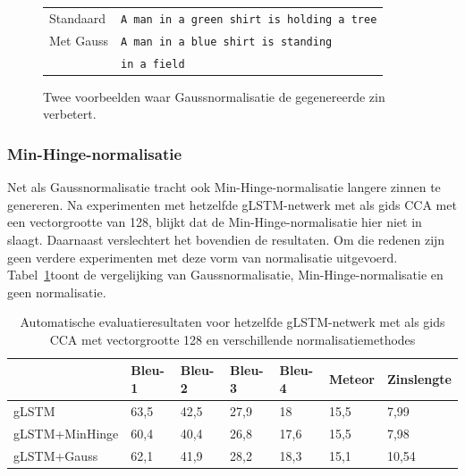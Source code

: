 \begin{figure}
\begin{minipage}[t]{.3\textwidth}
		\end{minipage}\hfill
		\begin{minipage}[t]{.7\textwidth}
			\vspace{0pt}
			\begin{tabular}{ll}
				Standaard & \texttt{A man in a green shirt is holding a tree} \\
				Met Gauss & \texttt{A man in a blue shirt is standing }\\
				~ & \texttt{in a field} \\
			\end{tabular}
		\end{minipage}
\caption{Twee voorbeelden waar Gaussnormalisatie de gegenereerde zin verbetert.}
\label{fig:gauss_improve}
\end{figure}
\subsubsection{Min-Hinge-normalisatie}
Net als Gaussnormalisatie tracht ook Min-Hinge-normalisatie langere zinnen te genereren.
Na experimenten met hetzelfde gLSTM-netwerk met als gids CCA met een vectorgrootte van 128, blijkt dat de Min-Hinge-normalisatie hier niet in slaagt. Daarnaast verslechtert het bovendien de resultaten. Om die redenen zijn geen verdere experimenten met deze vorm van normalisatie uitgevoerd. Tabel~\ref{table:minhinge}toont de vergelijking van Gaussnormalisatie, Min-Hinge-normalisatie en geen normalisatie.

\begin{table}
	\centering
	\begin{tabular}{lllllll}
		~                  & Bleu-1 & Bleu-2 & Bleu-3 & Bleu-4 & Meteor&Zinslengte \\ \hline
		gLSTM        & 63,5   & 42,5 			& 27,9   & 18   & 15,5&7,99  \\
		gLSTM+MinHinge & 60,4   &40,4    &26,8   & 17,6   & 15,5& 7,98 \\
		gLSTM+Gauss   & 62,1   & 41,9   & 28,2   & 18,3 & 15,1& 10,54 \\ \hline
		
	\end{tabular}
	
	\caption{Automatische evaluatieresultaten voor hetzelfde gLSTM-netwerk met als gids CCA met vectorgrootte 128 en verschillende normalisatiemethodes}
	\label{table:minhinge}
\end{table}

